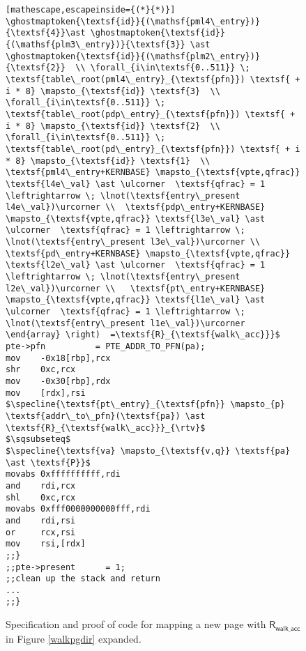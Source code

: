 \begin{figure}
\begin{lstlisting}[mathescape,escapeinside={(*}{*)}]
\ghostmaptoken{\textsf{id}}{(\mathsf{pml4\_entry})}{\textsf{4}}\ast \ghostmaptoken{\textsf{id}}{(\mathsf{plm3\_entry})}{\textsf{3}} \ast \ghostmaptoken{\textsf{id}}{(\mathsf{plm2\_entry})}{\textsf{2}}  \\ \forall_{i\in\textsf{0..511}} \; \textsf{table\_root(pml4\_entry}_{\textsf{pfn}}) \textsf{ + i * 8} \mapsto_{\textsf{id}} \textsf{3}  \\ \forall_{i\in\textsf{0..511}} \; \textsf{table\_root(pdp\_entry}_{\textsf{pfn}}) \textsf{ + i * 8} \mapsto_{\textsf{id}} \textsf{2}  \\ \forall_{i\in\textsf{0..511}} \; \textsf{table\_root(pd\_entry}_{\textsf{pfn}}) \textsf{ + i * 8} \mapsto_{\textsf{id}} \textsf{1}  \\  \textsf{pml4\_entry+KERNBASE} \mapsto_{\textsf{vpte,qfrac}} \textsf{l4e\_val} \ast \ulcorner  \textsf{qfrac} = 1 \leftrightarrow \; \lnot(\textsf{entry\_present l4e\_val})\urcorner \\  \textsf{pdp\_entry+KERNBASE} \mapsto_{\textsf{vpte,qfrac}} \textsf{l3e\_val} \ast \ulcorner  \textsf{qfrac} = 1 \leftrightarrow \; \lnot(\textsf{entry\_present l3e\_val})\urcorner \\  \textsf{pd\_entry+KERNBASE} \mapsto_{\textsf{vpte,qfrac}} \textsf{l2e\_val} \ast \ulcorner  \textsf{qfrac} = 1 \leftrightarrow \; \lnot(\textsf{entry\_present l2e\_val})\urcorner \\   \textsf{pt\_entry+KERNBASE} \mapsto_{\textsf{vpte,qfrac}} \textsf{l1e\_val} \ast \ulcorner  \textsf{qfrac} = 1 \leftrightarrow \; \lnot(\textsf{entry\_present l1e\_val})\urcorner    \end{array} \right)  =\textsf{R}_{\textsf{walk\_acc}}}$
pte->pfn          = PTE_ADDR_TO_PFN(pa);
mov    -0x18[rbp],rcx
shr    0xc,rcx
mov    -0x30[rbp],rdx
mov    [rdx],rsi
$\specline{\textsf{pt\_entry}_{\textsf{pfn}} \mapsto_{p} \textsf{addr\_to\_pfn}(\textsf{pa}) \ast \textsf{R}_{\textsf{walk\_acc}}}_{\rtv}$
$\sqsubseteq$
$\specline{\textsf{va} \mapsto_{\textsf{v,q}} \textsf{pa} \ast \textsf{P}}$
movabs 0xffffffffff,rdi
and    rdi,rcx
shl    0xc,rcx
movabs 0xfff0000000000fff,rdi
and    rdi,rsi
or     rcx,rsi
mov    rsi,[rdx]
;;}
;;pte->present      = 1;
;;clean up the stack and return
...
;;}
\end{lstlisting}
  \caption{Specification and proof of code for mapping a new page with $\textsf{R}_{\textsf{walk\_acc}}$ in Figure \ref{walkpgdir} expanded.}
\label{fig:mapping_code}
\end{figure}

